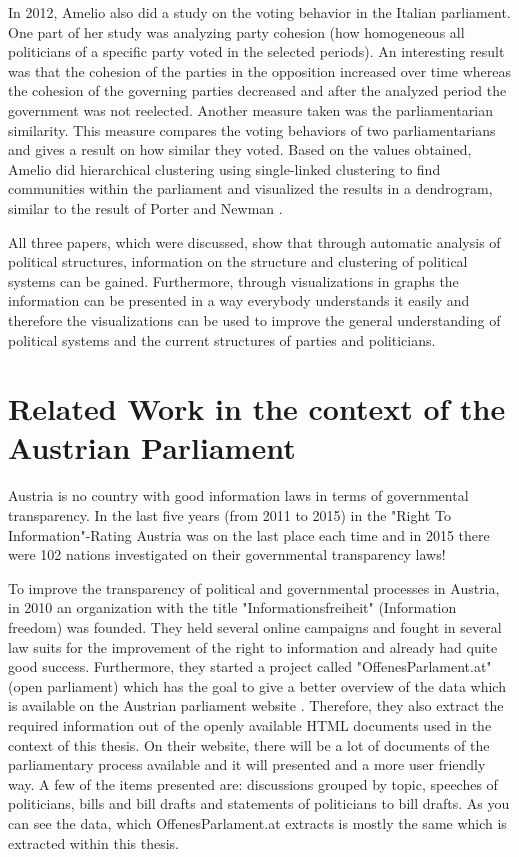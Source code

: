 In 2012, Amelio \cite{Amelio_2012} also did a study on the voting behavior in the Italian parliament. One part of her study was analyzing party cohesion (how homogeneous all politicians of a specific party voted in the selected periods). An interesting result was that the cohesion of the parties in the opposition increased over time whereas the cohesion of the governing parties decreased and after the analyzed period the government was not reelected. Another measure taken was the parliamentarian similarity. This measure compares the voting behaviors of two parliamentarians and gives a result on how similar they voted. Based on the values obtained, Amelio did hierarchical clustering using single-linked clustering to find communities within the parliament and visualized the results in a dendrogram, similar to the result of Porter and Newman \cite{Porter_2005}. 

All three papers, which were discussed, show that through automatic analysis of political structures, information on the structure and clustering of political systems can be gained. Furthermore, through visualizations in graphs the information can be presented in a way everybody understands it easily and therefore the visualizations can be used to improve the general understanding of political systems and the current structures of parties and politicians.

\section{Related Work in the context of the Austrian Parliament}
Austria is no country with good information laws in terms of governmental transparency. In the last five years (from 2011 to 2015) in the "Right To Information"-Rating Austria was on the last place each time and in 2015 there were 102 nations investigated on their governmental transparency laws!

To improve the transparency of political and governmental processes in Austria, in 2010 an organization with the title "Informationsfreiheit" (Information freedom) \cite{Informationsfreiheit_2015} was founded. They held several online campaigns and fought in several law suits for the improvement of the right to information and already had quite good success. Furthermore, they started a project called "OffenesParlament.at" (open parliament) \cite{OffenesParlament_2015} which has the goal to give a better overview of the data which is available on the Austrian parliament website \cite{AustrianParliament_2015}. Therefore, they also extract the required information out of the openly available HTML documents used in the context of this thesis. On their website, there will be a lot of documents of the parliamentary process available and it will presented and a more user friendly way. A few of the items presented are: discussions grouped by topic, speeches of politicians, bills and bill drafts and statements of politicians to bill drafts. As you can see the data, which OffenesParlament.at extracts is mostly the same which is extracted within this thesis.

